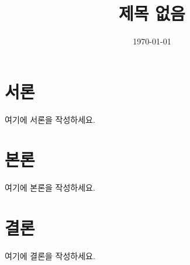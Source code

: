 \documentclass{article}
\title{제목 없음}
\author{}
\date{\today}
\begin{document}
\maketitle

\section{서론}
여기에 서론을 작성하세요.

\section{본론}
여기에 본론을 작성하세요.

\section{결론}
여기에 결론을 작성하세요.
\end{document}
